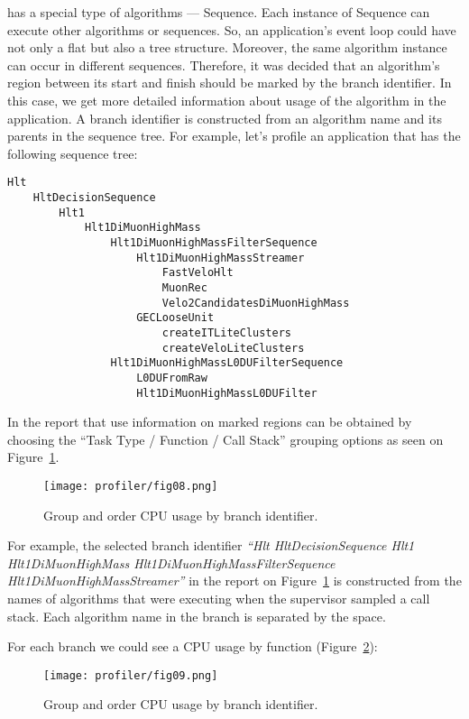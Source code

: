 \gaudi has a special type of algorithms --- Sequence. Each instance of Sequence
can execute other algorithms or sequences. So, an application's event loop
could have not only a flat but also a tree structure. Moreover, the same
algorithm instance can occur in different sequences. Therefore, it was decided
that an algorithm's region between its start and finish should be marked by the
branch identifier. In this case, we get more detailed information about usage
of the algorithm in the application. A branch identifier is constructed from an
algorithm name and its parents in the sequence tree. For example, let's profile
an application that has the following sequence tree:
\begin{verbatim}
Hlt 
    HltDecisionSequence 
        Hlt1 
            Hlt1DiMuonHighMass
                Hlt1DiMuonHighMassFilterSequence
                    Hlt1DiMuonHighMassStreamer
                        FastVeloHlt
                        MuonRec
                        Velo2CandidatesDiMuonHighMass
                    GECLooseUnit
                        createITLiteClusters
                        createVeloLiteClusters
                Hlt1DiMuonHighMassL0DUFilterSequence
                    L0DUFromRaw
                    Hlt1DiMuonHighMassL0DUFilter
\end{verbatim}

In \amp the report that use information on marked regions can be obtained by
choosing the ``Task Type / Function / Call Stack'' grouping options as seen on
Figure~\ref{fig08}.

\begin{figure}[H]
\texttt{[image: profiler/fig08.png]}
\caption{Group and order CPU usage by branch identifier.}
\label{fig08}
\end{figure}

For example, the selected branch identifier {\it ``Hlt HltDecisionSequence Hlt1 Hlt1DiMuonHighMass Hlt1DiMuonHighMassFilterSequence Hlt1DiMuonHighMassStreamer''} in the report on Figure~\ref{fig08} is constructed from the names of algorithms that were executing 
when the \amp supervisor sampled a call stack. Each algorithm name in the branch is separated by the space. 

For each branch we could see a CPU usage by function (Figure~\ref{fig09}):

\begin{figure}[H]
\texttt{[image: profiler/fig09.png]}
\caption{Group and order CPU usage by branch identifier.}
\label{fig09}
\end{figure}

